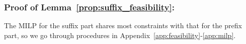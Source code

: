 \documentclass[Afour,sageh,times]{sagej}
\newcommand{\auto}[1]{\ccalA_{\textup{#1}}}
\newcommand{\autop}{\ccalA_{\phi}}
\begin{document}
{{%


\subsubsection{Proof of Lemma~\ref{prop:suffix_feasibility}:}\label{app:suffix_feasibility}
The MILP for the suffix part shares most constraints with that for the prefix part,  so we go through procedures in Appendix~\ref{app:feasibility}-\ref{app:milp}.

}}
\end{document}
